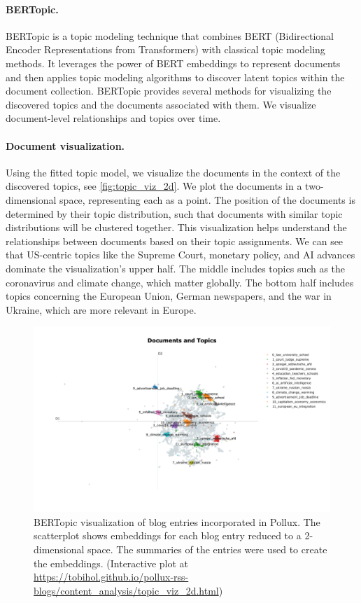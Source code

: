 \documentclass{article}
\begin{document}
\paragraph{BERTopic.}
BERTopic \citep{grootendorstBERTopicNeuralTopic2022} is a topic modeling technique that combines BERT (Bidirectional Encoder Representations from Transformers) with classical topic modeling methods. It leverages the power of BERT embeddings to represent documents and then applies topic modeling algorithms to discover latent topics within the document collection.
BERTopic provides several methods for visualizing the discovered topics and the documents associated with them. We visualize document-level relationships and topics over time.

\paragraph{Document visualization.}
Using the fitted topic model, we visualize the documents in the context of the discovered topics, see \autoref{fig:topic_viz_2d}. We plot the documents in a two-dimensional space, representing each as a point. The position of the documents is determined by their topic distribution, such that documents with similar topic distributions will be clustered together. This visualization helps understand the relationships between documents based on their topic assignments. We can see that US-centric topics like the Supreme Court, monetary policy, and AI advances dominate the visualization's upper half. The middle includes topics such as the coronavirus and climate change, which matter globally. The bottom half includes topics concerning the European Union, German newspapers, and the war in Ukraine, which are more relevant in Europe.

\begin{figure}[!htb]
    \includegraphics[width=1.0\textwidth]{figures/topic_viz_2d.png}
    \caption{BERTopic visualization of blog entries incorporated in Pollux. The scatterplot shows embeddings for each blog entry reduced to a 2-dimensional space. The summaries of the entries were used to create the embeddings. (Interactive plot at \url{https://tobihol.github.io/pollux-rss-blogs/content_analysis/topic_viz_2d.html})}
    \label{fig:topic_viz_2d}
\end{figure}
\end{document}
